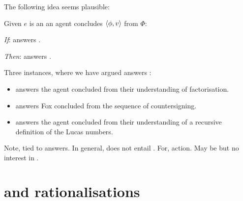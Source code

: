\begin{note}
  The following idea seems plausible:

  \begin{idea}%
    \label{idea:fof-r}%
    Given \(e\) is an  an agent concludes \(\langle\phi, v\rangle\) from \(\Phi\):
    \begin{itenum}
    \item[\emph{If}:]
       answers \qWhy{}.
    \item[\emph{Then}:]
       answers \qWhyR{}.
    \end{itenum}
  \end{idea}

  Three instances, where we have argued  answers \qWhy{}:

  \begin{itemize}
  \item
     answers \qWhyR{} the agent concluded  from their understanding of factorisation.
  \item
     answers \qWhyR{} Fox concluded  from the sequence of countersigning.
  \item
     answers \qWhyR{} the agent concluded  from their understanding of a recursive definition of the Lucas numbers.
  \end{itemize}

  Note, tied to answers.
  In general, \fingfr{} does not entail \motingr{}.
  For, action.
  May be \fof{} but no interest in \evalion{}.
\end{note}

\section{\issueInclusion{} and rationalisations}


